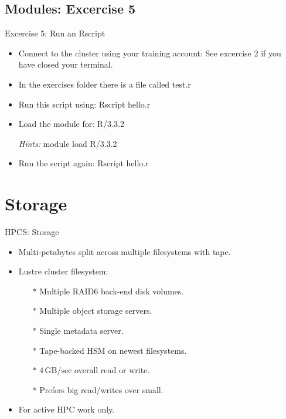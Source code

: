\subsection{Modules: Excercise 5}
\begin{frame}[fragile]{Excercise 5: Run an Rscript}
\begin{itemize}
\item{Connect to the cluster using your training account: See excercise 2 if you have closed your terminal. }
\item{In the exercises folder there is a file called test.r}
\item{Run this script using: Rscript hello.r }
\item{Load the module for: R/3.3.2}
\item[\emph{Hints:}]{\alert{module load R/3.3.2}}
\item{Run the script again: Rscript hello.r}
\end{itemize}
\end{frame}

\section{Storage}
\begin{frame}{HPCS: Storage}
\begin{itemize}
\item{Multi-petabytes split across multiple filesystems with tape.}
\item{Lustre cluster filesystem:}
\begin{itemize}
\item[$\ast$]{Multiple RAID6 back-end disk volumes.}
\item[$\ast$]{Multiple object storage servers.}
\item[$\ast$]{Single metadata server.}
\item[$\ast$]{Tape-backed HSM on newest filesystems.}
\pause
\item[$\ast$]{\alert{$4\,\text{GB/sec}$ overall read or write.}}
\pause
\item[$\ast$]{\alert{Prefers big read/writes over small.}}
\end{itemize}
\pause
\item{\alert{For active HPC work only.}}
\end{itemize}
\end{frame}

